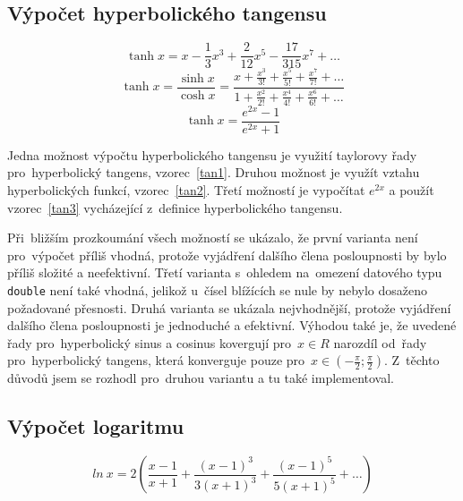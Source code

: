\documentclass[12pt,a4paper,titlepage,final]{article}
\begin{document}
\subsection{Výpočet hyperbolického tangensu}

\begin{equation}
\label{tan1}\tanh{x}=x-\frac{1}{3}x^3+\frac{2}{12}x^5-\frac{17}{315}x^7+\ldots
\end{equation}
\begin{equation}
\label{tan2}\tanh{x}=\frac{\sinh{x}}{\cosh{x}}=
\frac{x+\frac{x^{3}}{3!}+\frac{x^{5}}{5!}+\frac{x^{7}}{7!}+\ldots}
     {1+\frac{x^{2}}{2!}+\frac{x^{4}}{4!}+\frac{x^{6}}{6!}+\ldots}
\end{equation}
\begin{equation}
\label{tan3}\tanh{x}=\frac{e^{2x}-1}{e^{2x}+1}
\end{equation}

Jedna možnost výpočtu hyperbolického tangensu je využití taylorovy řady
pro~hyperbolický tangens, vzorec~\ref{tan1}.
Druhou možnost je využít vztahu hyperbolických funkcí, vzorec~\ref{tan2}.
Třetí možností je vypočítat $e^{2x}$ a použít vzorec~\ref{tan3} vycházející z~definice
hyperbolického tangensu.

Při~bližším prozkoumání všech možností se ukázalo, že první varianta není pro~výpočet
příliš vhodná, protože vyjádření dalšího člena posloupnosti
by bylo příliš složité a neefektivní. Třetí varianta s~ohledem na~omezení datového typu
\texttt{double} není také vhodná, jelikož u~čísel blížících se nule
by nebylo dosaženo požadované přesnosti. Druhá varianta se ukázala nejvhodnější,
protože vyjádření dalšího člena posloupnosti je jednoduché a efektivní. Výhodou také je, že
uvedené řady pro~hyperbolický sinus a cosinus kovergují pro~$x\in{R}$ narozdíl 
od~řady pro~hyperbolický tangens, která konverguje pouze 
pro~$x\in{\left(-\frac{\pi}{2};\frac{\pi}{2} \right) }$.
Z~těchto důvodů jsem se rozhodl pro~druhou variantu a tu také implementoval.
\subsection{Výpočet logaritmu}

\begin{equation}
\label{log1}ln~x=2\left(\frac{x-1}{x+1}+\frac{(x-1)^{3}}{3(x+1)^{3}}+\frac{(x-1)^{5}}{5(x+1)^{5}}+\ldots \right)
\end{equation}
\end{document}
